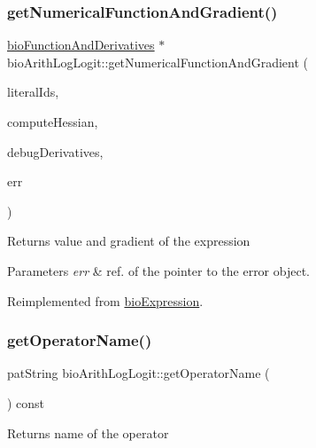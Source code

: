 \subsubsection{\texorpdfstring{get\+Numerical\+Function\+And\+Gradient()}{getNumericalFunctionAndGradient()}}
{\footnotesize\ttfamily \hyperlink{classbio_function_and_derivatives}{bio\+Function\+And\+Derivatives} $\ast$ bio\+Arith\+Log\+Logit\+::get\+Numerical\+Function\+And\+Gradient (\begin{DoxyParamCaption}\item[{vector$<$ pat\+U\+Long $>$}]{literal\+Ids,  }\item[{pat\+Boolean}]{compute\+Hessian,  }\item[{pat\+Boolean}]{debug\+Derivatives,  }\item[{pat\+Error $\ast$\&}]{err }\end{DoxyParamCaption})\hspace{0.3cm}{\ttfamily [virtual]}}

\begin{DoxyReturn}{Returns}
value and gradient of the expression 
\end{DoxyReturn}

\begin{DoxyParams}{Parameters}
{\em err} & ref. of the pointer to the error object. \\
\hline
\end{DoxyParams}


Reimplemented from \hyperlink{classbio_expression_a91c81ce80c9e972c913b10f5f3c1ed13}{bio\+Expression}.

\mbox{\label{classbio_arith_log_logit_adb9566e06a59ee20cf8b0bc8897b95cd}} 
\subsubsection{\texorpdfstring{get\+Operator\+Name()}{getOperatorName()}}
{\footnotesize\ttfamily pat\+String bio\+Arith\+Log\+Logit\+::get\+Operator\+Name (\begin{DoxyParamCaption}{ }\end{DoxyParamCaption}) const\hspace{0.3cm}{\ttfamily [virtual]}}

\begin{DoxyReturn}{Returns}
name of the operator 
\end{DoxyReturn}


